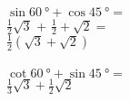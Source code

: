 \documentclass{article}
\begin{document}
 \\
$\sin \SI{60}{\degree} + \cos \SI{45}{\degree} =$ \\
$\frac{1}{2} \sqrt{3}$ + $\frac{1}{2} + \sqrt{2} =$ \\
$\frac{1}{2} (\sqrt{3} + \sqrt{2})$ \\
 \\
$\cot \SI{60}{\degree} + \sin \SI{45}{\degree} =$ \\
$\frac{1}{3} \sqrt{3} + \frac{1}{2} \sqrt{2}$
\end{document}
